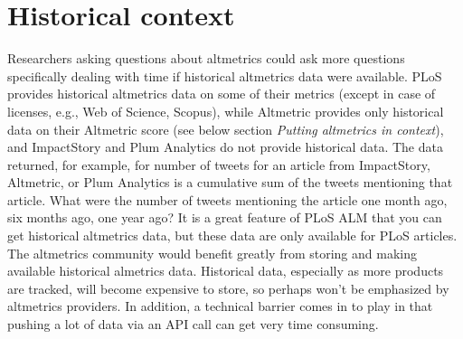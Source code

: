 \documentclass[letterpaper,superscriptaddress,showkeys,longbibliography]{revtex4-1}\usepackage{graphicx, color}
\begin{document}
\section*{Historical context}

Researchers asking questions about altmetrics could ask more questions specifically dealing with time if historical altmetrics data were available. PLoS provides historical altmetrics data on some of their metrics (except in case of licenses, e.g., Web of Science, Scopus), while Altmetric provides only historical data on their Altmetric score (see below section \emph{Putting altmetrics in context}), and ImpactStory and Plum Analytics do not provide historical data. The data returned, for example, for number of tweets for an article from ImpactStory, Altmetric, or Plum Analytics is a cumulative sum of the tweets mentioning that article. What were the number of tweets mentioning the article one month ago, six months ago, one year ago? It is a great feature of PLoS ALM that you can get historical altmetrics data, but these data are only available for PLoS articles. The altmetrics community would benefit greatly from storing and making available historical almetrics data. Historical data, especially as more products are tracked, will become expensive to store, so perhaps won't be emphasized by altmetrics providers. In addition, a technical barrier comes in to play in that pushing a lot of data via an API call can get very time consuming. 


\end{document}
